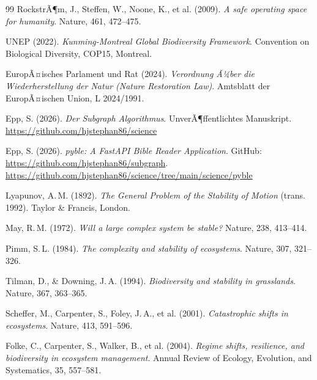 ﻿\documentclass[a4paper,12pt]{article}
\theoremstyle{definition}
\begin{document}
\begin{thebibliography}{99}
RockstrÃ¶m, J., Steffen, W., Noone, K., et al. (2009).
\textit{A safe operating space for humanity}.
Nature, 461, 472--475.

UNEP (2022).
\textit{Kunming-Montreal Global Biodiversity Framework}.
Convention on Biological Diversity, COP15, Montreal.

EuropÃ¤isches Parlament und Rat (2024).
\textit{Verordnung Ã¼ber die Wiederherstellung der Natur (Nature Restoration Law)}.
Amtsblatt der EuropÃ¤ischen Union, L 2024/1991.

Epp, S. (2026).
\textit{Der Subgraph Algorithmus}.
UnverÃ¶ffentlichtes Manuskript.
\url{https://github.com/hjstephan86/science}

Epp, S. (2026).
\textit{pyble: A FastAPI Bible Reader Application}.
GitHub: \url{https://github.com/hjstephan86/subgraph}.
\url{https://github.com/hjstephan86/science/tree/main/science/pyble}

Lyapunov, A.\,M. (1892).
\textit{The General Problem of the Stability of Motion} (trans. 1992).
Taylor \& Francis, London.

May, R.\,M. (1972).
\textit{Will a large complex system be stable?}
Nature, 238, 413--414.

Pimm, S.\,L. (1984).
\textit{The complexity and stability of ecosystems}.
Nature, 307, 321--326.

Tilman, D., \& Downing, J.\,A. (1994).
\textit{Biodiversity and stability in grasslands}.
Nature, 367, 363--365.

Scheffer, M., Carpenter, S., Foley, J.\,A., et al. (2001).
\textit{Catastrophic shifts in ecosystems}.
Nature, 413, 591--596.

Folke, C., Carpenter, S., Walker, B., et al. (2004).
\textit{Regime shifts, resilience, and biodiversity in ecosystem management}.
Annual Review of Ecology, Evolution, and Systematics, 35, 557--581.

\end{thebibliography}
\end{document}
